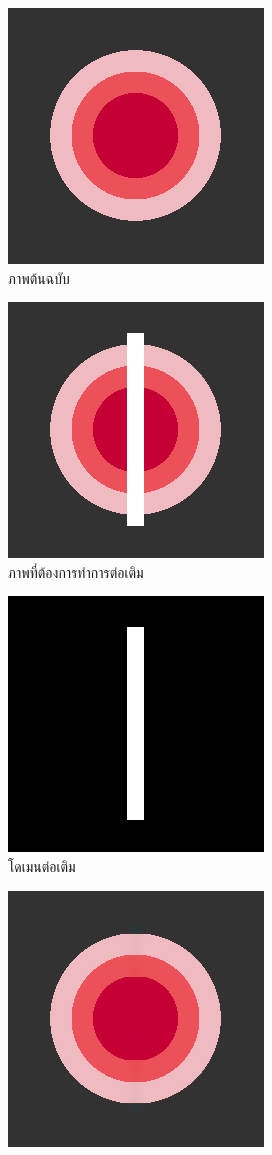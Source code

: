 \documentclass[hidelinks,a4paper,14pt]{article}
\numberwithin{equation}{section}							%
\begin{document}
{			\begin{figure}[H]
				\centering
				\begin{subfigure}{0.4\linewidth}
					\centering
					\includegraphics[width=0.4\linewidth]{images/color_inpaint/original.png}
					\caption{ภาพต้นฉบับ}
				\end{subfigure}
				\begin{subfigure}{0.4\linewidth}
					\centering
					\includegraphics[width=0.4\linewidth]{images/color_inpaint/toinpaint.png}
					\caption{ภาพที่ต้องการทำการต่อเติม}
				\end{subfigure}
				\begin{subfigure}{0.4\linewidth}
					\centering
					\includegraphics[width=0.4\linewidth]{images/color_inpaint/inpaintdomain.png}
					\caption{โดเมนต่อเติม}
				\end{subfigure}
				\begin{subfigure}{0.4\linewidth}
					\centering
					\includegraphics[width=0.4\linewidth]{images/color_inpaint/result_splitbergman.png}

\end{subfigure}
\end{figure}}
\end{document}
